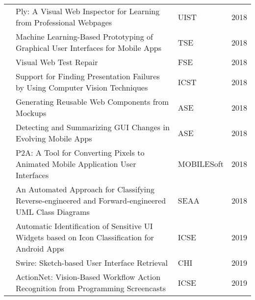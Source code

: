 \begin{sidewaystable}
\begin{tabular}{@{} lp{12.9cm}ll @{}}
\citet{Lim-2018-UIST}        & Ply: A Visual Web Inspector for Learning from Professional Webpages                                                                 & UIST           & 2018          \\

\citet{Moran-TSE-2018}       & Machine Learning-Based Prototyping of Graphical User Interfaces for Mobile Apps                                                     & TSE            & 2018          \\
\citet{Stocco-2018-FSE}      & Visual Web Test Repair                                                                                                              & FSE            & 2018          \\
\citet{Tanno-2018-ICSTW}     & Support for Finding Presentation Failures by Using Computer Vision Techniques                                                       & ICST           & 2018          \\
\citet{bajammal2018generating}    & Generating Reusable Web Components from Mockups                                                                                     & ASE            & 2018          \\
\citet{Moran-2018-ASE}       & Detecting and Summarizing GUI Changes in Evolving Mobile Apps                                                                       & ASE            & 2018          \\
\citet{Natarajan-2018-MOBILESoft} & P2A: A Tool for Converting Pixels to Animated Mobile Application User Interfaces                                               & MOBILESoft     & 2018          \\
\citet{Osman-2018-SEAA}      & An Automated Approach for Classifying Reverse-engineered and Forward-engineered UML Class Diagrams                                  & SEAA           & 2018          \\
\citet{Xiao-2019-ICSE}       & Automatic Identification of Sensitive UI Widgets based on Icon Classification for Android Apps                                      & ICSE           & 2019          \\ 
\citet{Huang-2019-CHI}       & Swire: Sketch-based User Interface Retrieval                                                                                        & CHI            & 2019          \\

\citet{Zhao-2019-ICSE}       & ActionNet: Vision-Based Workflow Action Recognition from Programming Screencasts                                                    & ICSE           & 2019          \\


\end{tabular}
\end{sidewaystable}
